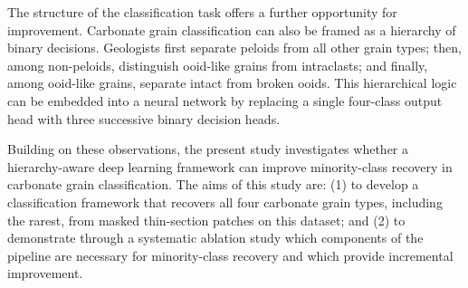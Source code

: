 \documentclass[a4paper,fleqn]{cas-dc}
\begin{document}
The structure of the classification task offers a further opportunity for improvement. Carbonate grain classification can also be framed as a hierarchy of binary decisions. Geologists first separate peloids from all other grain types; then, among non-peloids, distinguish ooid-like grains from intraclasts; and finally, among ooid-like grains, separate intact from broken ooids. This hierarchical logic can be embedded into a neural network by replacing a single four-class output head with three successive binary decision heads.

Building on these observations, the present study investigates whether a hierarchy-aware deep learning framework can improve minority-class recovery in carbonate grain classification. The aims of this study are: (1) to develop a classification framework that recovers all four carbonate grain types, including the rarest, from masked thin-section patches on this dataset; and (2) to demonstrate through a systematic ablation study which components of the pipeline are necessary for minority-class recovery and which provide incremental improvement.

\end{document}

